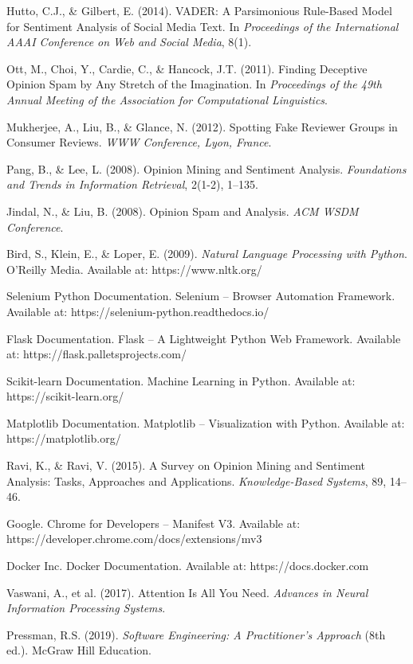 \documentclass[12pt,a4paper]{report}
\begin{document}
\begin{singlespace}
\noindent [1] Hutto, C.J., \& Gilbert, E. (2014). VADER: A Parsimonious Rule-Based Model for Sentiment Analysis of Social Media Text. In \textit{Proceedings of the International AAAI Conference on Web and Social Media}, 8(1).

\medskip\noindent [2] Ott, M., Choi, Y., Cardie, C., \& Hancock, J.T. (2011). Finding Deceptive Opinion Spam by Any Stretch of the Imagination. In \textit{Proceedings of the 49th Annual Meeting of the Association for Computational Linguistics}.

\medskip\noindent [3] Mukherjee, A., Liu, B., \& Glance, N. (2012). Spotting Fake Reviewer Groups in Consumer Reviews. \textit{WWW Conference, Lyon, France}.

\medskip\noindent [4] Pang, B., \& Lee, L. (2008). Opinion Mining and Sentiment Analysis. \textit{Foundations and Trends in Information Retrieval}, 2(1-2), 1--135.

\medskip\noindent [5] Jindal, N., \& Liu, B. (2008). Opinion Spam and Analysis. \textit{ACM WSDM Conference}.

\medskip\noindent [6] Bird, S., Klein, E., \& Loper, E. (2009). \textit{Natural Language Processing with Python}. O'Reilly Media. Available at: https://www.nltk.org/

\medskip\noindent [7] Selenium Python Documentation. Selenium -- Browser Automation Framework. Available at: https://selenium-python.readthedocs.io/

\medskip\noindent [8] Flask Documentation. Flask -- A Lightweight Python Web Framework. Available at: https://flask.palletsprojects.com/

\medskip\noindent [9] Scikit-learn Documentation. Machine Learning in Python. Available at: https://scikit-learn.org/

\medskip\noindent [10] Matplotlib Documentation. Matplotlib -- Visualization with Python. Available at: https://matplotlib.org/

\medskip\noindent [11] Ravi, K., \& Ravi, V. (2015). A Survey on Opinion Mining and Sentiment Analysis: Tasks, Approaches and Applications. \textit{Knowledge-Based Systems}, 89, 14--46.

\medskip\noindent [12] Google. Chrome for Developers -- Manifest V3. Available at: https://developer.chrome.com/docs/extensions/mv3

\medskip\noindent [13] Docker Inc. Docker Documentation. Available at: https://docs.docker.com

\medskip\noindent [14] Vaswani, A., et al. (2017). Attention Is All You Need. \textit{Advances in Neural Information Processing Systems}.

\medskip\noindent [15] Pressman, R.S. (2019). \textit{Software Engineering: A Practitioner's Approach} (8th ed.). McGraw Hill Education.
\end{singlespace}
\end{document}
